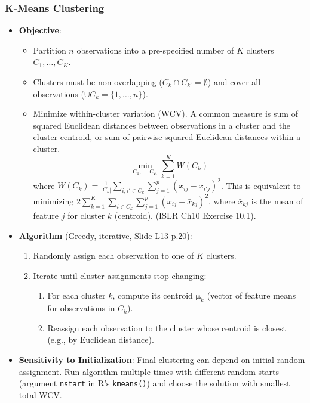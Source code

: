 \documentclass[12pt,a4paper]{article}
\newcommand{\Rfunction}[1]{\texttt{#1()}} %
\newcommand{\Rcode}[1]{\texttt{#1}} %
\begin{document}
    \subsubsection{K-Means Clustering}
        \begin{itemize}
            \item \textbf{Objective}:
                \begin{itemize}
                    \item Partition $n$ observations into a pre-specified number of $K$ clusters $C_1, \dots, C_K$.
                    \item Clusters must be non-overlapping ($C_k \cap C_{k'} = \emptyset$) and cover all observations ($\cup C_k = \{1, \dots, n\}$).
                    \item Minimize within-cluster variation (WCV). A common measure is sum of squared Euclidean distances between observations in a cluster and the cluster centroid, or sum of pairwise squared Euclidean distances within a cluster.
                        $$ \min_{C_1, \dots, C_K} \sum_{k=1}^K W(C_k) $$
                        where $W(C_k) = \frac{1}{|C_k|} \sum_{i,i' \in C_k} \sum_{j=1}^p (x_{ij} - x_{i'j})^2$.
                        This is equivalent to minimizing $2 \sum_{k=1}^K \sum_{i \in C_k} \sum_{j=1}^p (x_{ij} - \bar{x}_{kj})^2$, where $\bar{x}_{kj}$ is the mean of feature $j$ for cluster $k$ (centroid). (ISLR Ch10 Exercise 10.1).
                \end{itemize}
            \item \textbf{Algorithm} (Greedy, iterative, Slide L13 p.20):
                \begin{enumerate}
                    \item Randomly assign each observation to one of $K$ clusters.
                    \item Iterate until cluster assignments stop changing:
                        \begin{enumerate}
                            \item For each cluster $k$, compute its centroid $\boldsymbol{\mu}_k$ (vector of feature means for observations in $C_k$).
                            \item Reassign each observation to the cluster whose centroid is closest (e.g., by Euclidean distance).
                        \end{enumerate}
                \end{enumerate}
            \item \textbf{Sensitivity to Initialization}: Final clustering can depend on initial random assignment. Run algorithm multiple times with different random starts (argument \Rcode{nstart} in R's \Rfunction{kmeans}) and choose the solution with smallest total WCV.

\end{itemize}
\end{document}
